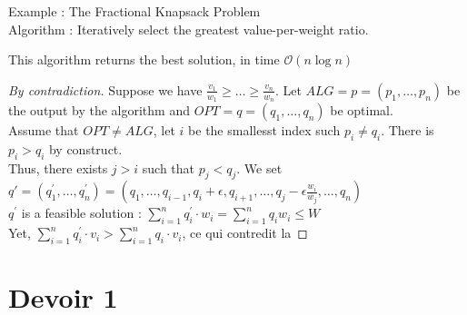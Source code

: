 \documentclass{cours}
\begin{document}
Example : The Fractional Knapsack Problem\\
Algorithm : Iteratively select the greatest value-per-weight ratio. \\
\begin{theorem}
    This algorithm returns the best solution, in time $\mathcal{O}(n \log n)$
\end{theorem}
\begin{proof}[By contradiction]
    Suppose we have $\frac{v_{1}}{w_{1}} \geq \ldots \geq \frac{v_{n}}{w_{n}}$. Let $ALG = p = (p_{1}, \ldots, p_{n})$ be the output by the algorithm and $OPT = q = (q_{1}, \ldots, q_{n})$ be optimal.\\
    Assume that $OPT \neq ALG$, let $i$ be the smallesst index such $p_{i} \neq q_{i}$. There is $p_{i} > q_{i}$ by construct. \\
    Thus, there exists $j > i$ such that $p_{j} < q_{j}$. We set $q' = (q_{1}^{'}, \ldots, q_{n}^{'}) = (q_{1}, \ldots, q_{i-1}, q_{i} + \epsilon, q_{i+1}, \ldots, q_{j} - \epsilon\frac{w_{i}}{w_{j}}, \ldots, q_{n})$\\
    $q^{'}$ is a feasible solution : $\sum\limits_{i = 1}^{n} q_{i}^{'} \cdot w_{i} = \sum\limits_{i = 1}^{n} q_{i} w_{i} \leq W$\\
    Yet, $\sum\limits_{i = 1}^{n} q_{i}^{'} \cdot v_{i} > \sum\limits_{i = 1}^{n} q_{i} \cdot v_{i}$, ce qui contredit la 
\end{proof}

\part{Devoir 1}
\end{document}
